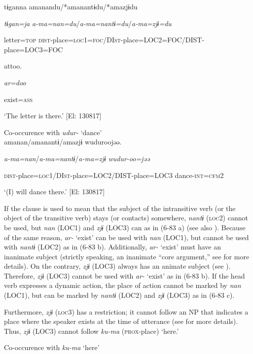 {\TM}
\gll tɨganna  amanandu/*amanantɨdu/*amazjɨdu

    \textit{tɨgan=ja}  \textit{a-ma=nan=du}/\textit{a-ma=nantɨ=du}/\textit{a-ma=zjɨ=du}

    letter=\textsc{top}  \textsc{dist}-place=\textsc{loc}1=\textsc{foc}/DI\textsc{st}-place=LOC2=FOC/DIST-place=LOC3=FOC

    attoo.  

    \textit{ar=doo}  

    exist=\textsc{ass}

\glt    ‘The letter is there.’ [El: 130817]

\ex Co-occurence with \textit{udur-} ‘dance’\\

{\TM}
\gll *amanan/amanantɨ/amazjɨ  wuduroojəə.

    \textit{a-ma=nan}/\textit{a-ma=nantɨ}/\textit{a-ma=zjɨ}  \textit{wudur-oo=jəə}

    \textsc{dist}-place=\textsc{loc}1/DI\textsc{st}-place=LOC2/DIST-place=LOC3  dance-\textsc{int}=\textsc{cfm}2

 \glt    ‘(I) will dance there.’ [El: 130817]

If the clause is used to mean that the subject of the intransitive verb (or the object of the transitive verb) stays (or contacts) somewhere, \textit{nantɨ} (\textsc{loc}2) cannot be used, but \textit{nan} (LOC1) and \textit{zjɨ} (LOC3) can as in (6-83 a) (see also ). Because of the same reason, \textit{ar-} ‘exist’ can be used with \textit{nan} (LOC1), but cannot be used with \textit{nantɨ} (LOC2) as in (6-83 b). Additionally, \textit{ar-} ‘exist’ must have an inanimate subject (strictly speaking, an inanimate “core argument,” see  for more details). On the contrary, \textit{zjɨ} (LOC3) always has an animate subject (see ). Therefore, \textit{zjɨ} (LOC3) cannot be used with \textit{ar-} ‘exist’ as in (6-83 b). If the head verb expresses a dynamic action, the place of action cannot be marked by \textit{nan} (LOC1), but can be marked by \textit{nantɨ} (LOC2) and \textit{zjɨ} (LOC3) as in (6-83 c).

  Furthermore, \textit{zjɨ} (\textsc{loc}3) has a restriction; it cannot follow an NP that indicates a place where the speaker exists at the time of utterance (see  for more details). Thus, \textit{zjɨ} (LOC3) cannot follow \textit{ku-ma} (\textsc{prox}-place) ‘here.’

\ea\label{ex:6-84}
 Co-occurence with \textit{ku-ma} ‘here’\\

